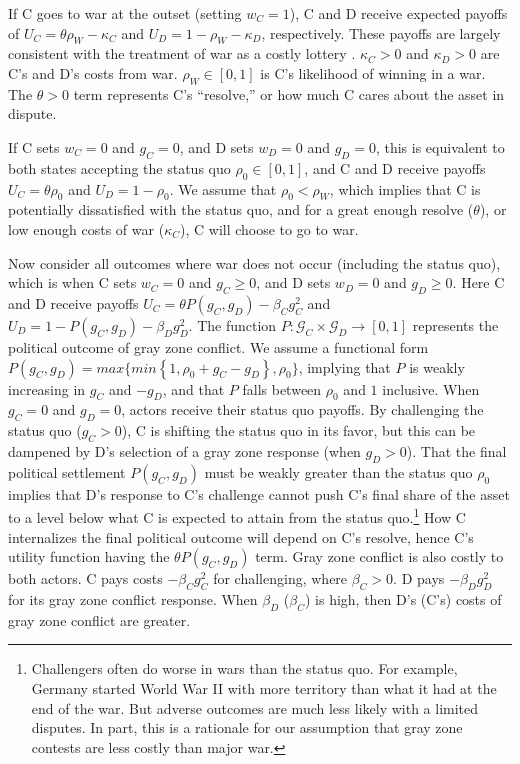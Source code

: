 \documentclass[bibtex, autowc]{apsr_submission}
\begin{document}
    If C goes to war at the outset (setting $w_{C}=1$), C and D receive expected payoffs of $U_{C}=\theta\rho_{W}-\kappa_{C}$ and $U_{D}=1-\rho_{W}-\kappa_{D}$, respectively. These payoffs are largely consistent with the treatment of war as a costly lottery \citep{fearon_signalingforeignpolicy_1997}. $\kappa_{C}>0$ and $\kappa_{D}>0$ are C's and D's costs from war. $\rho_{W}\in[0,1]$ is C's likelihood of winning in a war. The $\theta>0$ term represents C's ``resolve,'' or how much C cares about the asset in dispute.
    
    If C sets $w_{C}=0$ and $g_{C}=0$, and D sets $w_{D}=0$ and $g_{D}=0$, this is equivalent to both states accepting the status quo $\rho_{0}\in[0,1]$, and C and D receive payoffs $U_{C}=\theta\rho_{0}$ and $U_{D}=1-\rho_{0}$. We assume that $\rho_{0}<\rho_{W}$, which implies that C is potentially dissatisfied with the status quo, and for a great enough resolve ($\theta$), or low enough costs of war ($\kappa_{C}$), C will choose to go to war.
     
    Now consider all outcomes where war does not occur (including the status quo), which is when C sets $w_{C}=0$ and $g_{C}\geq0$, and D sets $w_{D}=0$ and $g_{D}\geq0$. Here C and D receive payoffs $U_{C}=\theta P(g_{C},g_{D})-\beta_{C}g_{C}^{2}$ and $U_{D}=1-P(g_{C},g_{D})-\beta_{D}g_{D}^{2}$. The function $P:\mathcal{\mathcal{G}}_{C}\times\mathcal{G}_{D}\rightarrow[0,1]$ represents the political outcome of gray zone conflict. We assume a functional form $P(g_{C},g_{D})=max\{min\left\{ 1,\rho_{0}+g_{C}-g_{D}\right\} ,\rho_{0}\}$, implying that $P$ is weakly increasing in $g_{C}$ and $-g_{D}$, and that $P$ falls between $\rho_{0}$ and $1$ inclusive. When $g_{C}=0$ and $g_{D}=0$, actors receive their status quo payoffs. By challenging the status quo ($g_{C}>0$), C is shifting the status quo in its favor, but this can be dampened by D's selection of a gray zone response (when $g_{D}>0$). That the final political settlement $P(g_{C},g_{D})$ must be weakly greater than the status quo $\rho_{0}$ implies that D's response to C's challenge cannot push C's final share of the asset to a level below what C is expected to attain from the status quo.\footnote{Challengers often do worse in wars than the status quo. For example, Germany started World War II with more territory than what it had at the end of the war. But adverse outcomes are much less likely with a limited disputes. In part, this is a rationale for our assumption that gray zone contests are less costly than major war.} How C internalizes the final political outcome will depend on C's resolve, hence C's utility function having the $\theta P(g_{C},g_{D})$ term. Gray zone conflict is also costly to both actors. C pays costs $-\beta_{C}g_{C}^{2}$ for challenging, where $\beta_{C}>0$. D pays $-\beta_{D}g_{D}^{2}$ for its gray zone conflict response. When $\beta_{D}$ ($\beta_{C}$) is high, then D's (C's) costs of gray zone conflict are greater. 
    
\end{document}
